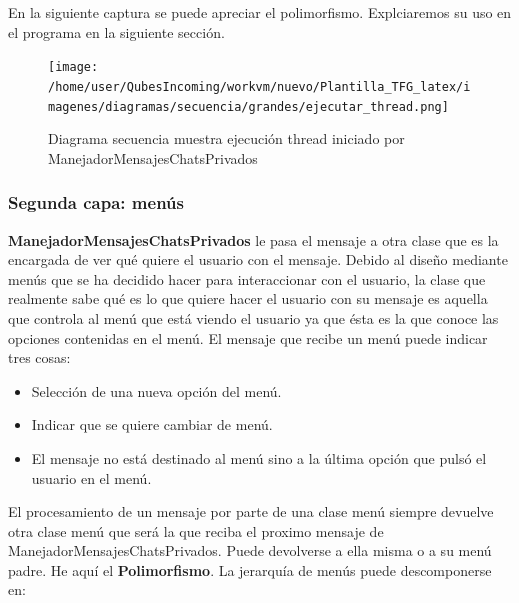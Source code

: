 En la siguiente captura se puede apreciar el polimorfismo. Explciaremos su uso en el programa en la siguiente sección.

\begin{figure}[H] %
\centering
\texttt{[image: /home/user/QubesIncoming/workvm/nuevo/Plantilla\_TFG\_latex/imagenes/diagramas/secuencia/grandes/ejecutar\_thread.png]}  %

\caption{Diagrama secuencia muestra ejecución thread iniciado por ManejadorMensajesChatsPrivados }\label{figura223}
\end{figure}
\subsubsection*{Segunda capa: menús}


\textbf{ManejadorMensajesChatsPrivados} le pasa el mensaje a otra clase que es la encargada de ver qué quiere el usuario con el mensaje. 
 Debido al diseño mediante menús que se ha decidido hacer  para interaccionar con el usuario, la clase que realmente sabe qué es lo que quiere hacer el usuario con su mensaje es aquella que controla al menú que está viendo el usuario ya que ésta es la que conoce las opciones contenidas en el menú. El mensaje que recibe un menú puede indicar tres cosas:
\begin{itemize}
\item Selección de una nueva opción del menú.
\item Indicar que se quiere cambiar de menú.
\item El mensaje no está destinado al menú sino a la última opción que pulsó el usuario en el menú.
\end{itemize} 
 
 El procesamiento de un mensaje por parte de una clase menú siempre devuelve otra clase menú que será la que reciba el proximo mensaje de ManejadorMensajesChatsPrivados. Puede devolverse a ella misma o a su menú padre. He aquí el \textbf{Polimorfismo}.
 La jerarquía de menús puede descomponerse en:
 
